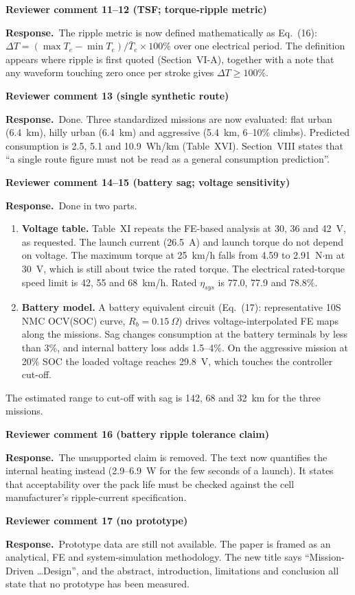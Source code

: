 \documentclass[10pt]{article}
\newcommand{\rev}[1]{\par\medskip\noindent\textbf{Reviewer comment #1}\par}
\newcommand{\resp}{\par\noindent\textcolor{blue!50!black}{\textbf{Response.}}~}
\begin{document}
\rev{11--12 (TSF; torque-ripple metric)}
\resp The ripple metric is now defined mathematically as Eq.~(16):
$\Delta T=(\max T_e-\min T_e)/\bar T_e\times100\%$ over one electrical period.
The definition appears where ripple is first quoted (Section~VI-A), together
with a note that any waveform touching zero once per stroke gives
$\Delta T\geq100$\%.

\rev{13 (single synthetic route)}
\resp Done. Three standardized missions are now evaluated: flat urban (6.4~km),
hilly urban (6.4~km) and aggressive (5.4~km, 6--10\% climbs). Predicted
consumption is 2.5, 5.1 and 10.9~Wh/km (Table~XVI). Section~VIII states that
``a single route figure must not be read as a general consumption prediction''.

\rev{14--15 (battery sag; voltage sensitivity)}
\resp Done in two parts.
\begin{enumerate}[nosep]
\item \textbf{Voltage table.} Table~XI repeats the FE-based analysis at 30, 36
and 42~V, as requested. The launch current (26.5~A) and launch torque do not
depend on voltage. The maximum torque at 25~km/h falls from 4.59 to
2.91~N$\cdot$m at 30~V, which is still about twice the rated torque. The
electrical rated-torque speed limit is 42, 55 and 68~km/h. Rated $\eta_{sys}$
is 77.0, 77.9 and 78.8\%.
\item \textbf{Battery model.} A battery equivalent circuit (Eq.~(17):
representative 10S NMC OCV(SOC) curve, $R_b=0.15~\Omega$) drives
voltage-interpolated FE maps along the missions. Sag changes consumption at the
battery terminals by less than 3\%, and internal battery loss adds 1.5--4\%.
On the aggressive mission at 20\% SOC the loaded voltage reaches 29.8~V, which
touches the controller cut-off.
\end{enumerate}
The estimated range to cut-off with sag is 142, 68 and 32~km for the three
missions.

\rev{16 (battery ripple tolerance claim)}
\resp The unsupported claim is removed. The text now quantifies the internal
heating instead (2.9--6.9~W for the few seconds of a launch). It states that
acceptability over the pack life must be checked against the cell
manufacturer's ripple-current specification.

\rev{17 (no prototype)}
\resp Prototype data are still not available. The paper is framed as an
analytical, FE and system-simulation methodology. The new title says
``Mission-Driven \ldots Design'', and the abstract, introduction, limitations
and conclusion all state that no prototype has been measured.
\end{document}
